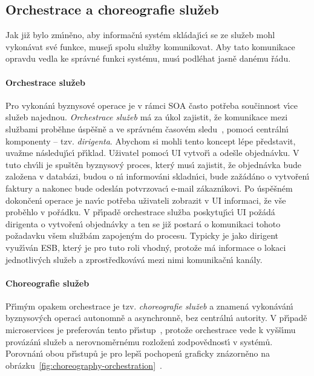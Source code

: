\subsection{Orchestrace a choreografie služeb}

Jak již bylo zm\'{\i}něno, aby informačn\'{\i} systém skládaj\'{\i}c\'{\i} se ze služeb mohl vykonávat
své funkce, musej\'{\i} spolu služby komunikovat. Aby tato komunikace opravdu vedla
ke správné funkci systému, mus\'{\i} podléhat jasně danému řádu.

\paragraph{Orchestrace služeb}
Pro vykonán\'{\i} byznysové operace je v rámci \gls{SOA} často potřeba součinnost v\'{\i}ce služeb
najednou. \textit{Orchestrace služeb} má za úkol zajistit, že komunikace mezi službami
proběhne úspěšně a ve správném časovém sledu~\cite{orchestration},
pomoc\'{\i} centráln\'{\i} komponenty – tzv. \textit{dirigenta}.
Abychom si mohli tento koncept lépe představit, uvažme následuj\'{\i}c\'{\i} př\'{\i}klad. Uživatel
pomoc\'{\i} \gls{UI} vytvoř\'{\i} a odešle objednávku. V tuto chv\'{\i}li
je spuštěn byznysov\'y proces, kter\'y mus\'{\i} zajistit, že objednávka bude založena v databázi,
budou o n\'{\i} informováni skladn\'{\i}ci, bude zažádáno o vytvořen\'{\i} faktury a nakonec bude odeslán
potvrzovac\'{\i} e-mail zákazn\'{\i}kovi. Po úspěšném dokončen\'{\i} operace je nav\'{\i}c potřeba uživateli
zobrazit v \gls{UI} informaci, že vše proběhlo v pořádku. V př\'{\i}padě orchestrace služba
poskytuj\'{\i}c\'{\i} \gls{UI} požádá dirigenta o vytvořen\'{\i} objednávky a ten se již postará o
komunikaci tohoto požadavku všem službám zapojen\'ym do procesu.
Typicky je jako dirigent využ\'{\i}ván \gls{ESB}, kter\'y je pro tuto roli vhodn\'y,
protože má informace o lokaci jednotliv\'ych služeb a zprostředkovává mezi nimi
komunikačn\'{\i} kanály.

\paragraph{Choreografie služeb}
Př\'{\i}m\'ym opakem orchestrace je tzv. \textit{choreografie služeb} a znamená
vykonáván\'{\i} byznysov\'ych operac\'{\i} autonomně a asynchronně, bez centráln\'{\i}
autority. V př\'{\i}padě microservices je preferován tento př\'{\i}stup~\cite{dragoni2017microservices},
protože orchestrace vede k vyšš\'{\i}mu provázán\'{\i} služeb a nerovnoměrnému rozložen\'{\i}
zodpovědnost\'{\i} v systémů. Porovnán\'{\i} obou př\'{\i}stupů je pro lepš\'{\i} pochopen\'{\i} graficky
znázorněno na obrázku~\ref{fig:choreography-orchestration}~\cite{orchestrationvschoreography}.

